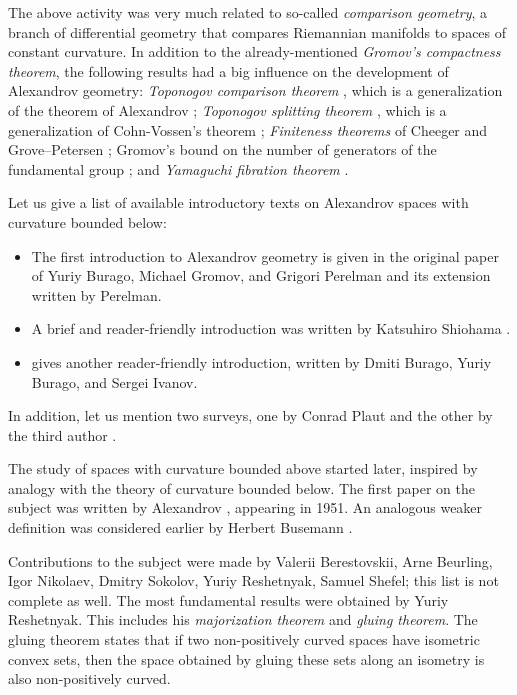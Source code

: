 The above activity was very much related to so-called {}\emph{comparison geometry},
a branch of differential geometry that compares Riemannian manifolds  to  spaces of constant curvature.
In addition to the already-mentioned {}\emph{Gromov's compactness theorem},
the following results had a big influence on the development of Alexandrov geometry:
{}\emph{Toponogov comparison theorem} \cite{toponogov-globalization+splitting}, which is a generalization of the theorem of Alexandrov \cite{alexandrov-comparison};
{}\emph{Toponogov splitting theorem} \cite{toponogov-globalization+splitting}, which is a generalization of Cohn-Vossen's theorem \cite{cohn-vossen_line};
{}\emph{Finiteness theorems} of
Cheeger
and
Grove--Petersen \cite{cheeger-finiteness,grove-petersen:finiteness};
Gromov's bound on the number of generators of the fundamental group 
\cite[1.5]{gromov:almost-flat};
and 
{}\emph{Yamaguchi fibration theorem} \cite{yamaguchi-fibration}.

%
Let us give a list of available introductory texts on Alexandrov spaces with curvature bounded below: 
\begin{itemize}
\item The first introduction to Alexandrov geometry is given in the original paper of Yuriy Burago, Michael Gromov, and Grigori Perelman \cite{burago-gromov-perelman} 
and its extension \cite{perelman:spaces2} written by Perelman.
\item A brief and reader-friendly introduction was written by Katsuhiro Shiohama \cite[Sections 1--8]{shiohama}.
\item \cite[Chapter 10]{burago-burago-ivanov} gives another reader-friendly introduction, written by Dmiti Burago, Yuriy Burago, and Sergei Ivanov.
\end{itemize}
In addition, let us mention two surveys, one by Conrad Plaut \cite{plaut:survey} and the other by the third author \cite{petrunin:survey}.

{\sloppy

The study of  spaces with curvature bounded above started later,
inspired by analogy with the theory of curvature bounded below.
The first paper on the subject was written by Alexandrov \cite{alexandrov:strong-angle}, appearing in 1951.
An analogous weaker definition was considered earlier by Herbert Busemann \cite{busemann-CBA}.

}

Contributions to the subject were made by
Valerii Berestovskii, 
Arne Beurling, 
Igor Nikolaev,
Dmitry Sokolov,
Yuriy Reshetnyak,
Samuel Shefel; this list is not complete as well.
The most fundamental results were obtained by Yuriy Reshetnyak.
This includes his {}\emph{majorization theorem} and {}\emph{gluing theorem}.
The gluing theorem states that if two non-positively curved spaces have isometric convex sets, then the space obtained by gluing these sets along an isometry is also non-positively curved.

